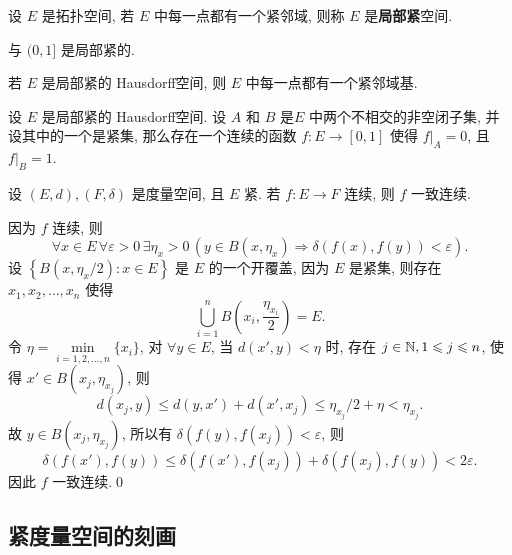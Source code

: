     \begin{Definition}[局部紧]\label{def:局部紧}
         设 $ E $ 是拓扑空间, 若 $ E $ 中每一点都有一个紧邻域, 则称 $ E $ 是\textbf{局部紧}空间.
    \end{Definition}

    \begin{Example}
        \R 与 $ (0, 1] $ 是局部紧的.
    \end{Example}

    \begin{Remark}
        若 $ E $ 是局部紧的 Hausdorff空间, 则 $ E $ 中每一点都有一个紧邻域基.
    \end{Remark}

    \begin{Theorem}[Urysohn引理]
         设 $ E $ 是局部紧的 Hausdorff空间. 设 $ A $ 和 $ B $ 是$ E $ 中两个不相交的非空闭子集, 并设其中的一个是紧集, 那么存在一个连续的函数 $ f:E\to[0,1] $ 使得 $ f|_{A}=0 $, 且 $ f|_{B}=1 $.
    \end{Theorem}

    \begin{Theorem}
         设 $ (E, d), (F, \delta) $ 是度量空间, 且 $ E $ 紧. 若 $ f:E\to F $ 连续, 则 $ f $ 一致连续.
    \end{Theorem}

    \begin{Proof}
        因为 $ f $ 连续, 则
        \[
            \forall x\in E\,\forall \varepsilon>0\,\exists\eta_{x}>0\,(y\in B(x, \eta_{x})\Rightarrow \delta(f(x), f(y))<\varepsilon).
        \]
        设 $\left\{ B(x, \eta_{x}/2) : x\in E \right\}$ 是 $ E $ 的一个开覆盖, 因为 $ E $ 是紧集, 则存在 $ x_{1}, x_{2},\dots,x_{n} $ 使得
        \[
            \bigcup_{i=1}^{n} B\left(x_{i}, \frac{\eta_{x_{i}}}{2}\right)=E.
        \]
        令 $ \eta=\min\limits_{i=1, 2, \dots, n}\{ x_{i} \} $, 对 $ \forall y\in E $, 当 $ d(x', y)<\eta $ 时, 存在 $ j\in\mathbb{N}, 1\leqslant j\leqslant n $, 使得 $ x'\in B(x_{j}, \eta_{x_{j}}) $, 则
        \[
            d(x_{j}, y) \leqslant d(y, x')+d(x', x_{j})\leqslant\eta_{x_{j}}/2+\eta<\eta_{x_{j}}.
        \]
        故 $ y\in B(x_{j}, \eta_{x_{j}}) $, 所以有 $ \delta(f(y), f(x_{j}))<\varepsilon $, 则
        \[
            \delta(f(x'), f(y))\leqslant \delta(f(x'), f(x_{j}))+\delta(f(x_{j}), f(y))<2\varepsilon.
        \]
        因此 $ f $ 一致连续.\qed
    \end{Proof}

    \subsection{紧度量空间的刻画}

